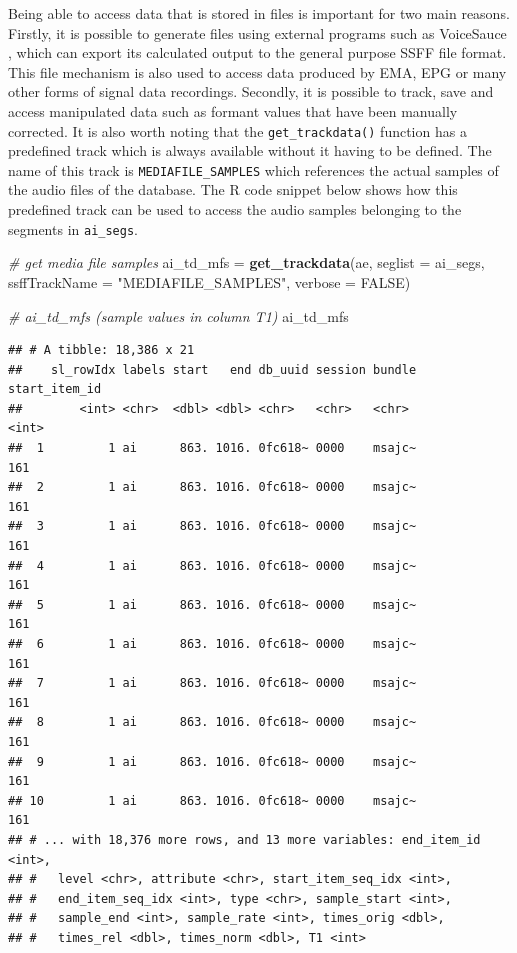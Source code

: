 \documentclass[]{book}
\newenvironment{Shaded}{\begin{snugshade}}{\end{snugshade}}
\newcommand{\CommentTok}[1]{\textcolor[rgb]{0.56,0.35,0.01}{\textit{#1}}}
\newcommand{\DataTypeTok}[1]{\textcolor[rgb]{0.13,0.29,0.53}{#1}}
\newcommand{\KeywordTok}[1]{\textcolor[rgb]{0.13,0.29,0.53}{\textbf{#1}}}
\newcommand{\NormalTok}[1]{#1}
\newcommand{\OtherTok}[1]{\textcolor[rgb]{0.56,0.35,0.01}{#1}}
\newcommand{\StringTok}[1]{\textcolor[rgb]{0.31,0.60,0.02}{#1}}
\begin{document}
Being able to access data that is stored in files is important for two main reasons. Firstly, it is possible to generate files using external programs such as VoiceSauce \citep{shue:2011a}, which can export its calculated output to the general purpose SSFF file format. This file mechanism is also used to access data produced by EMA, EPG or many other forms of signal data recordings. Secondly, it is possible to track, save and access manipulated data such as formant values that have been manually corrected. It is also worth noting that the \texttt{get\_trackdata()} function has a predefined track which is always available without it having to be defined. The name of this track is \texttt{MEDIAFILE\_SAMPLES} which references the actual samples of the audio files of the database. The R code snippet below shows how this predefined track can be used to access the audio samples belonging to the segments in \texttt{ai\_segs}.

\begin{Shaded}
\begin{Highlighting}[]
\CommentTok{# get media file samples}
\NormalTok{ai_td_mfs =}\StringTok{ }\KeywordTok{get_trackdata}\NormalTok{(ae,}
                          \DataTypeTok{seglist =}\NormalTok{ ai_segs,}
                          \DataTypeTok{ssffTrackName =} \StringTok{"MEDIAFILE_SAMPLES"}\NormalTok{,}
                          \DataTypeTok{verbose =} \OtherTok{FALSE}\NormalTok{)}

\CommentTok{# ai_td_mfs (sample values in column T1)}
\NormalTok{ai_td_mfs}
\end{Highlighting}
\end{Shaded}

\begin{verbatim}
## # A tibble: 18,386 x 21
##    sl_rowIdx labels start   end db_uuid session bundle start_item_id
##        <int> <chr>  <dbl> <dbl> <chr>   <chr>   <chr>          <int>
##  1         1 ai      863. 1016. 0fc618~ 0000    msajc~           161
##  2         1 ai      863. 1016. 0fc618~ 0000    msajc~           161
##  3         1 ai      863. 1016. 0fc618~ 0000    msajc~           161
##  4         1 ai      863. 1016. 0fc618~ 0000    msajc~           161
##  5         1 ai      863. 1016. 0fc618~ 0000    msajc~           161
##  6         1 ai      863. 1016. 0fc618~ 0000    msajc~           161
##  7         1 ai      863. 1016. 0fc618~ 0000    msajc~           161
##  8         1 ai      863. 1016. 0fc618~ 0000    msajc~           161
##  9         1 ai      863. 1016. 0fc618~ 0000    msajc~           161
## 10         1 ai      863. 1016. 0fc618~ 0000    msajc~           161
## # ... with 18,376 more rows, and 13 more variables: end_item_id <int>,
## #   level <chr>, attribute <chr>, start_item_seq_idx <int>,
## #   end_item_seq_idx <int>, type <chr>, sample_start <int>,
## #   sample_end <int>, sample_rate <int>, times_orig <dbl>,
## #   times_rel <dbl>, times_norm <dbl>, T1 <int>
\end{verbatim}
\end{document}
